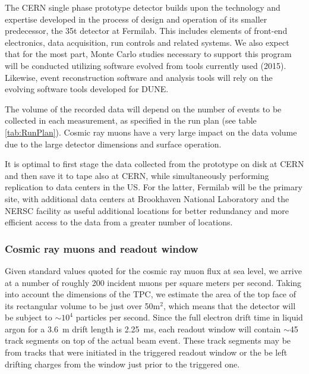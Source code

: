 \label{computing}

The CERN single phase prototype detector builds upon the technology and expertise developed in the
process of design and operation of its smaller predecessor, the 35t detector at Fermilab.
This includes elements of front-end electronics, data acquisition, run controls and related systems. We also expect that for the most part,
Monte Carlo studies necessary to support this program will be conducted utilizing software evolved from tools currently used (2015). Likewise,
event reconstruction software and analysis tools will rely on the evolving software tools developed for DUNE.

The volume of the recorded data  will depend on the number of events to be collected in each measurement,
as specified in the run plan (see table \ref{tab:RunPlan}).
Cosmic ray muons have a very large impact on the data volume due to the large detector dimensions and surface operation.

It is optimal to first stage the data collected from the prototype on disk at CERN and then save it to tape also at CERN,
while simultaneously performing replication to data centers in the US. For the latter, Fermilab will be the primary site, with additional data centers at Brookhaven National Laboratory and the NERSC facility as useful additional locations for better redundancy and more efficient access to the data from a greater number of locations.



\subsubsection{Cosmic ray muons and readout window}
\label{readout_windows}

Given standard values quoted for the cosmic ray muon flux at sea level, we arrive at a number of roughly 200 incident muons
per square meters per second.
Taking into account the dimensions of the TPC, we estimate the area of the top face of its rectangular volume to be just over 50m$^{2}$,
which means that the detector will be subject to $\sim10^{4}$ particles per second.
Since the full electron drift time in liquid argon for a 3.6~m drift length is 2.25~ms, each readout window will contain 
$\sim$45 track segments on top of the actual beam event. These track segments may be from tracks that were initiated in the triggered
readout window or the be left drifting charges from the window just prior to the triggered one.


